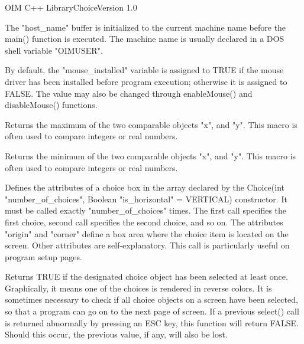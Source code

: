 \begin{manpage}{OIM C++ Library}{Choice}{Version 1.0}
\subtitle{Global \\ Variables}
    The "host_name" buffer is initialized to the current machine name
    before the main() function is executed.  The machine name is
    usually declared in a DOS shell variable "OIMUSER".

    By default, the "mouse_installed" variable is assigned to TRUE if
    the mouse driver has been installed before program execution;
    otherwise it is assigned to FALSE.  The value may also be changed
    through enableMouse() and disableMouse() functions.

\subtitle{Macros}
    Returns the maximum of the two comparable objects "x", and "y".
    This macro is often used to compare integers or real numbers.

    Returns the minimum of the two comparable objects "x", and "y".
    This macro is often used to compare integers or real numbers.

\subtitle{Public \\ Operations}
    Defines the attributes of a choice box in the array declared by the
    Choice(int "number_of_choices", Boolean "is_horizontal" = VERTICAL) 
    constructor. It must be called exactly "number_of_choices"
    times.  The first call specifies the first choice, second call specifies
    the second choice, and so on.  The attributes "origin" and "corner"
    define a box area where the choice item is located on the screen.  Other
    attributes are self-explanatory.  This call is particularly useful
    on program setup pages.

    Returns TRUE if the designated choice object has been selected at
    least once.  Graphically,
    it means one of the choices is rendered in reverse colors.  It is
    sometimes necessary to check if all choice objects on a screen have
    been selected, so that a program can go on to the next page of screen.
    If a previous select() call is returned abnormally by pressing an ESC key,
    this function will return FALSE. Should this occur, the previous 
    value, if any, will also be lost.

\subtitle{Virtual \\ Operations}


\end{manpage}
